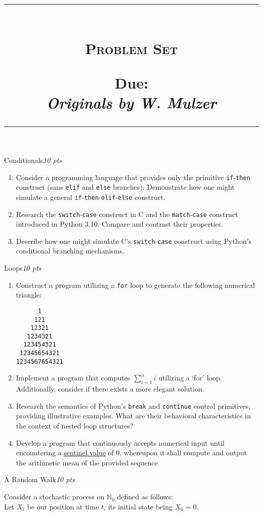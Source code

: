 \documentclass[a4paper,11pt]{article}
\title{
\hrule
\vspace{-0.5em}
\begin{multicols}{2}
\raggedright \large \textbf{\course}\\ %
\large \textsc{Problem Set \pset} \\
\vspace{0.25em}

\raggedleft \small \textbf{Due:} \due \\
\textit{Originals by W. Mulzer}
\end{multicols}
\vspace{-0.5em}
\hrule}
\date{}
\author{}
\newcounter{pnr}
\newcommand{\problem}[2]{\vspace{0.3cm}\item[Problem \arabic{pnr}]\stepcounter{pnr} #1\hfill\emph{#2}}
\begin{document}
\maketitle
\vspace{-2cm}
\begin{description}
\problem{Conditionals}{10 pts}

\begin{enumerate}
  \item Consider a programming language that provides only the primitive \texttt{if}-\texttt{then} construct (sans \texttt{elif} and \texttt{else} branches). Demonstrate how one might simulate a general \texttt{if}-\texttt{then}-\texttt{elif}-\texttt{else} construct.
  \item Research the \texttt{switch}-\texttt{case} construct in C and the \texttt{match}-\texttt{case} construct introduced in Python 3.10. Compare and contrast their properties.
  \item Describe how one might simulate C's \texttt{switch}-\texttt{case} construct using Python's conditional branching mechanisms.
\end{enumerate}

\problem{Loops}{10 pts}

\begin{enumerate}
\item Construct a program utilizing a \texttt{for} loop to generate the following numerical triangle:
\begin{lstlisting}
      1
     121
    12321
   1234321
  123454321
 12345654321
1234567654321
\end{lstlisting}
\item Implement a program that computes $\sum_{i=1}^n i$ utilizing a `for' loop. Additionally, consider if there exists a more elegant solution.
\item Research the semantics of Python's \texttt{break} and \texttt{continue} control primitives, providing illustrative examples. What are their behavioral characteristics in the context of nested loop structures?
\item Develop a program that continuously accepts numerical input until encountering a \href{https://en.wikipedia.org/wiki/Sentinel_value}{sentinel value} of 0, whereupon it shall compute and output the arithmetic mean of the provided sequence.
\end{enumerate}


\problem{A Random Walk}{10 pts}

Consider a stochastic process on $\mathbb{N}_0$ defined as follows:\\
Let $X_t$ be our position at time $t$, its initial state being $X_0=0$.


\end{description}
\end{document}
